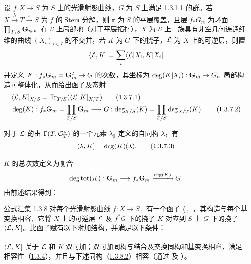 \subsubsection{} 设 $f:X\rightarrow S$ 为 $S$ 上的光滑射影曲线，$G$ 为 $S$ 上满足 \hyperref[XVIII.par1.3.1.1]{1.3.1.1} 的群。若 $X\xrightarrow{f_{0}}T\xrightarrow{\pi}S$ 为 $f$ 的 Stein 分解，则 $\pi$ 为 $S$ 的平展覆盖，且层 $f_{\ast}G_{m}$ 为环面 $\prod_{T/S}\mathbf{G}_{m}$。在 $S$ 上局部地（对于平展拓扑），$X$ 为 $S$ 上一族具有非空几何连通纤维的曲线 $(X_{i})_{i\in I}$ 的不交并。若 $K$ 为 $G$ 下的挠子，${\mathcal L}$ 为 $X$ 上的可逆层，则置 $$
\langle {\mathcal L},K]=\sum_{i}\langle {\mathcal L}|X_{i},K|X_{i}]
$$ 并定义 $K:f_{\ast}\mathbf{G}_{m}=\mathbf{G}^{I}_{m}\rightarrow G$ 的次数，其坐标为 $\deg(K|X_{i}):\mathbf{G}_{m}\rightarrow G$。局部构造可整体化，从而给出\pageoriginale 函子及态射 \begin{align*}
& \langle {\mathcal L},K]_{X/S}=\operatorname{Tr}_{T/S}(\langle {\mathcal L},K]_{X/T})\tag{1.3.7.1}\\
& \deg(K):f_{\ast}\mathbf{G}_{m}=\prod_{T/S}\mathbf{G}_{m}\longrightarrow G:\deg_{X/S}(K)=\prod_{T/S}\deg_{X/T}(K){}.\tag{1.3.7.2}
\end{align*} 

对于 ${\mathcal L}$ 的由 $\Gamma(T,{\mathcal O}^{\ast}_{T})$ 的一个元素 $\lambda_{0}$ 定义的自同构 $\lambda$，有 \begin{equation*}
\langle \lambda,K]=\deg(K)(\lambda){}.\tag{1.3.7.3}
\end{equation*}

$K$ 的总次数定义为复合 $$
\deg \operatorname{tot}(K):\mathbf{G}_{m}\longrightarrow
f_{\ast}\mathbf{G}_{m}\xrightarrow{\deg(K)}G{}.
$$ 由前述结果得到：

\begin{enonce*}[remark]{公式汇集 1.3.8} 对每个光滑射影曲线 $f:X\rightarrow S$，有一个函子 $\langle~,~]$，其构造与每个基变换相容，它将 $X$ 上的可逆层 ${\mathcal L}$ 及 $f^{\ast}G$ 下的挠子 $K$ 对应到 $S$ 上 $G$ 下的挠子 $\langle {\mathcal L},K]$。此函子赋有以下附加结构，并满足以下条件： \end{enonce*}

\setcounter{subsubsection}{8} \paragraph{} $\langle {\mathcal L},K]$ 关于 ${\mathcal L}$ 和 $K$ 双可加；双可加同构与结合及交换同构和基变换相容，满足相容性（\hyperref[XVIII.prop1.3.4]{1.3.4}），并且与下述同构（\hyperref[XVIII.par1.3.8.2]{1.3.8.2}）相容（通过  及 ）。

